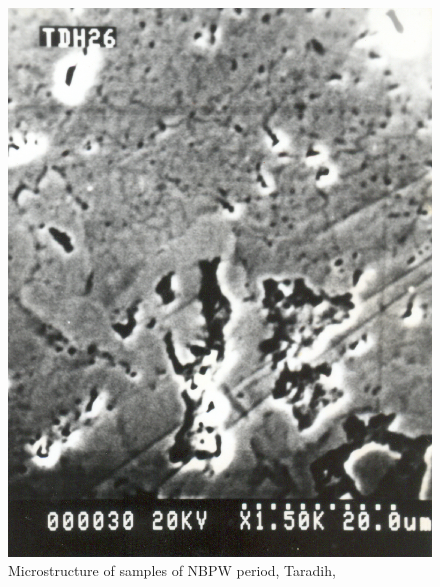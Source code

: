 \begin{figure}[H]
\renewcommand{\thefigure}{26B}
\includegraphics[scale=0.65]{images/chapter-4/fig026B.jpg}
\caption{Microstructure of samples of NBPW period, Taradih,}\label{chapter-4-fig26B}
\end{figure}

\newpage

